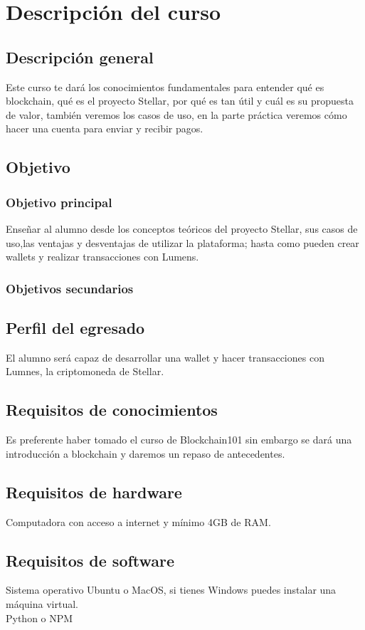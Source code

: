 \documentclass[a4paper,12pt]{/home/armando/Documentos/Cursos/LaTeX/Plantillas/lib/pub}
\begin{document}
\putLogo
\protecoTitle

\renewcommand{\contentsname}{Índice General}
\tableofcontents
\newpage

\section{Descripción del curso}
	\subsection{Descripción general}
	Este curso te dará los conocimientos fundamentales para entender qué es blockchain, qué es el proyecto Stellar, por qué es tan útil y cuál es su propuesta de valor, también veremos los casos de uso, en la parte práctica veremos cómo hacer una cuenta para enviar y recibir pagos.
	\subsection{Objetivo}
		\subsubsection{Objetivo principal}
		Enseñar al alumno desde los conceptos teóricos del proyecto Stellar, sus casos de uso,las ventajas y desventajas de utilizar la plataforma; hasta como pueden crear wallets y realizar transacciones con Lumens.
		\subsubsection{Objetivos secundarios}
	\subsection{Perfil del egresado}
	El alumno será capaz de desarrollar una wallet y hacer transacciones con Lumnes, la criptomoneda de Stellar.
	\subsection{Requisitos de conocimientos}
	Es preferente haber tomado el curso de Blockchain101 sin embargo se dará una introducción a blockchain y daremos un repaso de antecedentes.
	\subsection{Requisitos de hardware}
	Computadora con acceso a internet y mínimo 4GB de RAM.
	\subsection{Requisitos de software}
	Sistema operativo Ubuntu o MacOS, si tienes Windows puedes instalar una máquina virtual.\\
	Python o NPM
\end{document}

